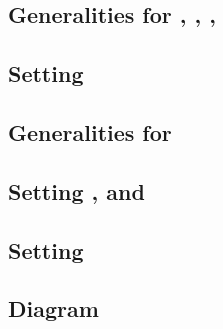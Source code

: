 \subsection{Generalities for \malformedDataInternalJustification{}, \malformedDataExternalJustification{}, \wellformedDataTrivial{}, \wellformedDataNonTrivial{}} \label{bls: generalities for malformed and wellformed}          
\subsection{Setting \malformedDataInternalJustification{}}                                                                                                        \label{bls: malformed data internal justification}              
\subsection{Generalities for \pairOfPointsContainsInfinity{}}                                                                                                     \label{bls: generalities for pair of points contains infinity}  
\subsection{Setting \malformedDataExternalBit, \malformedDataExternalAcc{} and \malformedDataExternalJustification}                                               \label{bls: malformed bit acc justification}                    
\subsection{Setting \trivialAcc{}}                                                                                                                                \label{bls: setting trivial}                                    
\subsection{Diagram}                                                                                                                                              \label{bls: setting diagrams}                                   
